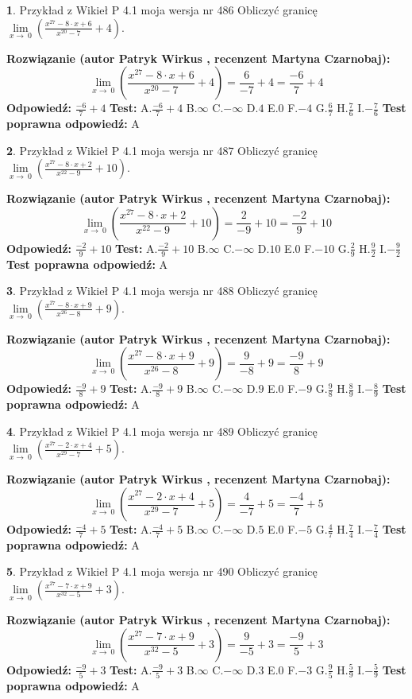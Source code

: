 \documentclass[12pt, a4paper]{article}
\theoremstyle{definition} %
\newtheorem{zad}{}
\newcommand{\zadStart}[1]{\begin{zad}#1\newline}
\newcommand{\zadStop}{\end{zad}}
\newcommand{\rozwStart}[2]{\noindent \textbf{Rozwiązanie (autor #1 , recenzent #2): }\newline}
\newcommand{\rozwStop}{\newline}
\newcommand{\odpStart}{\noindent \textbf{Odpowiedź:}\newline}
\newcommand{\odpStop}{\newline}
\newcommand{\testStart}{\noindent \textbf{Test:}\newline}
\newcommand{\testStop}{\newline}
\newcommand{\kluczStart}{\noindent \textbf{Test poprawna odpowiedź:}\newline}
\newcommand{\kluczStop}{\newline}
\begin{document}
\zadStart{Przykład z Wikieł P 4.1 moja wersja nr 486}
Obliczyć granicę $\lim\limits_{x\to\ 0}(\frac{x^{27}-8 \cdot x +6}{x^{20}-7}+4)$.
\zadStop
\rozwStart{Patryk Wirkus}{Martyna Czarnobaj}
$$\lim\limits_{x\to\ 0}(\frac{x^{27}-8 \cdot x +6}{x^{20}-7}+4)=\frac{6}{-7}+4=\frac{-6}{7}+4$$
\rozwStop
\odpStart
$\frac{-6}{7}+4$
\odpStop
\testStart
A.$\frac{-6}{7}+4$
B.$\infty$
C.$-\infty$
D.$4$
E.$0$
F.$-4$
G.$\frac{6}{7}$
H.$\frac{7}{6}$
I.$-\frac{7}{6}$
\testStop
\kluczStart
A
\kluczStop



\zadStart{Przykład z Wikieł P 4.1 moja wersja nr 487}
Obliczyć granicę $\lim\limits_{x\to\ 0}(\frac{x^{27}-8 \cdot x +2}{x^{22}-9}+10)$.
\zadStop
\rozwStart{Patryk Wirkus}{Martyna Czarnobaj}
$$\lim\limits_{x\to\ 0}(\frac{x^{27}-8 \cdot x +2}{x^{22}-9}+10)=\frac{2}{-9}+10=\frac{-2}{9}+10$$
\rozwStop
\odpStart
$\frac{-2}{9}+10$
\odpStop
\testStart
A.$\frac{-2}{9}+10$
B.$\infty$
C.$-\infty$
D.$10$
E.$0$
F.$-10$
G.$\frac{2}{9}$
H.$\frac{9}{2}$
I.$-\frac{9}{2}$
\testStop
\kluczStart
A
\kluczStop



\zadStart{Przykład z Wikieł P 4.1 moja wersja nr 488}
Obliczyć granicę $\lim\limits_{x\to\ 0}(\frac{x^{27}-8 \cdot x +9}{x^{26}-8}+9)$.
\zadStop
\rozwStart{Patryk Wirkus}{Martyna Czarnobaj}
$$\lim\limits_{x\to\ 0}(\frac{x^{27}-8 \cdot x +9}{x^{26}-8}+9)=\frac{9}{-8}+9=\frac{-9}{8}+9$$
\rozwStop
\odpStart
$\frac{-9}{8}+9$
\odpStop
\testStart
A.$\frac{-9}{8}+9$
B.$\infty$
C.$-\infty$
D.$9$
E.$0$
F.$-9$
G.$\frac{9}{8}$
H.$\frac{8}{9}$
I.$-\frac{8}{9}$
\testStop
\kluczStart
A
\kluczStop



\zadStart{Przykład z Wikieł P 4.1 moja wersja nr 489}
Obliczyć granicę $\lim\limits_{x\to\ 0}(\frac{x^{27}-2 \cdot x +4}{x^{29}-7}+5)$.
\zadStop
\rozwStart{Patryk Wirkus}{Martyna Czarnobaj}
$$\lim\limits_{x\to\ 0}(\frac{x^{27}-2 \cdot x +4}{x^{29}-7}+5)=\frac{4}{-7}+5=\frac{-4}{7}+5$$
\rozwStop
\odpStart
$\frac{-4}{7}+5$
\odpStop
\testStart
A.$\frac{-4}{7}+5$
B.$\infty$
C.$-\infty$
D.$5$
E.$0$
F.$-5$
G.$\frac{4}{7}$
H.$\frac{7}{4}$
I.$-\frac{7}{4}$
\testStop
\kluczStart
A
\kluczStop



\zadStart{Przykład z Wikieł P 4.1 moja wersja nr 490}
Obliczyć granicę $\lim\limits_{x\to\ 0}(\frac{x^{27}-7 \cdot x +9}{x^{32}-5}+3)$.
\zadStop
\rozwStart{Patryk Wirkus}{Martyna Czarnobaj}
$$\lim\limits_{x\to\ 0}(\frac{x^{27}-7 \cdot x +9}{x^{32}-5}+3)=\frac{9}{-5}+3=\frac{-9}{5}+3$$
\rozwStop
\odpStart
$\frac{-9}{5}+3$
\odpStop
\testStart
A.$\frac{-9}{5}+3$
B.$\infty$
C.$-\infty$
D.$3$
E.$0$
F.$-3$
G.$\frac{9}{5}$
H.$\frac{5}{9}$
I.$-\frac{5}{9}$
\testStop
\kluczStart
A
\kluczStop
\end{document}
